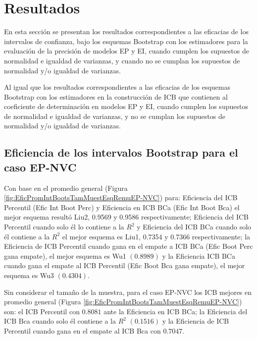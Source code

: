 \section{Resultados}
En esta sección se presentan los resultados correspondientes a las eficacias de los intervalos de confianza, bajo los esquemas Bootstrap con los estimadores para la evaluación de la precisión de modelos EP y EI, cuando cumplen los supuestos de normalidad e igualdad de varianzas, y cuando no se cumplan los supuestos de normalidad y/o igualdad de varianzas.
\vspace{.5cm}

Al igual que los resultados correspondientes a las eficacias de los esquemas Bootstrap con los estimadores en la construcción de ICB que contienen al coeficiente de determinación en modelos EP y EI, cuando cumplen los supuestos de normalidad e igualdad de varianzas, y no se cumplan los supuestos de normalidad y/o igualdad de varianzas.



\subsection{Eficiencia de los intervalos Bootstrap para el caso EP-NVC}
Con base en el promedio general (Figura \ref{fig:EficPromIntBootsTamMuestEsqRemuEP-NVC}) para: Eficiencia del ICB Percentil (Efic Int Boot Perc) y Eficiencia en ICB BCa (Efic Int Boot Bca) el mejor esquema resultó Liu2, 0.9569 y 0.9586 respectivamente;
Eficiencia del ICB Percentil cuando solo él lo contiene a la $R^{2}$ y Eficiencia del ICB BCa cuando solo él contiene a la $R^{2}$ el mejor esquema es Liu1, 0.7354 y 0.7366 respectivamente;
la Eficiencia de ICB Percentil cuando gana en el empate a ICB BCa (Efic Boot Perc gana empate), el mejor esquema es Wu1 $(0.8989)$ y la Eficiencia ICB BCa cuando gana el empate al ICB Percentil (Efic Boot Bca gana empate), el mejor esquema es Wu3 $(0.4304)$.
\vspace{.5cm}

Sin considerar el tamaño de la muestra, para el caso EP-NVC los ICB mejores en promedio general (Figura \ref{fig:EficPromIntBootsTamMuestEsqRemuEP-NVC}) son: el ICB Percentil con $0.8081$ ante la Eficiencia en ICB BCa; la Eficiencia del ICB Bca cuando solo él contiene a la $R^{2}$ $(0.1516)$ y la Eficiencia de ICB Percentil cuando gana en el empate al ICB Bca con $0.7047$.

